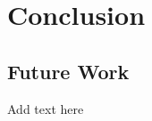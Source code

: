 \documentclass[../main.tex]{subfiles}
\begin{document}
\chapter{Conclusion}

\section{Future Work}
Add text here
\end{document}
